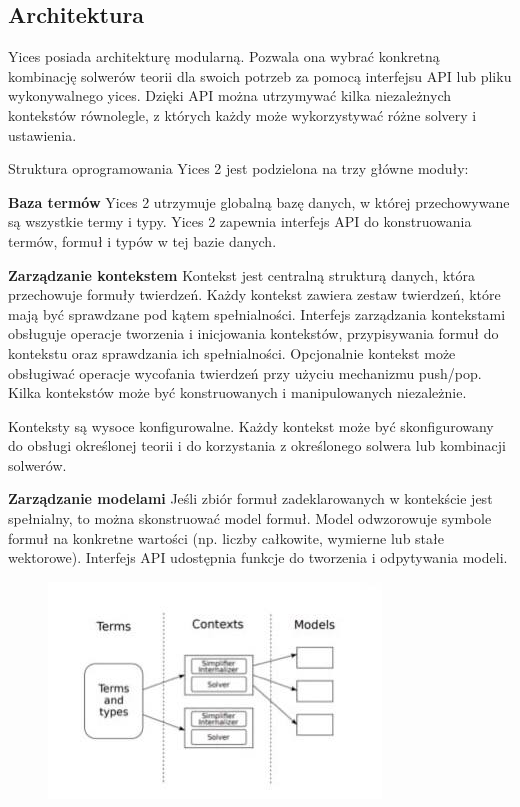 \subsection{Architektura}
Yices posiada architekturę modularną. Pozwala ona wybrać konkretną kombinację solwerów teorii dla swoich potrzeb za pomocą interfejsu API lub pliku wykonywalnego yices. Dzięki API można utrzymywać kilka niezależnych kontekstów równolegle, z których każdy może wykorzystywać różne solvery i ustawienia.

Struktura oprogramowania Yices 2 jest podzielona na trzy główne moduły:

\textbf{Baza termów} Yices 2 utrzymuje globalną bazę danych, w której przechowywane są wszystkie termy i typy.
Yices 2 zapewnia interfejs API do konstruowania termów, formuł i typów w tej bazie danych.

\textbf{Zarządzanie kontekstem} Kontekst jest centralną strukturą danych, która przechowuje formuły twierdzeń.
Każdy kontekst zawiera zestaw twierdzeń, które mają być sprawdzane pod kątem spełnialności. Interfejs zarządzania kontekstami obsługuje operacje tworzenia i inicjowania kontekstów, przypisywania formuł do kontekstu oraz sprawdzania ich spełnialności. Opcjonalnie kontekst może obsługiwać operacje wycofania twierdzeń przy użyciu mechanizmu push/pop. Kilka kontekstów może być konstruowanych i manipulowanych niezależnie.

Konteksty są wysoce konfigurowalne. Każdy kontekst może być skonfigurowany do obsługi określonej teorii i do korzystania z określonego solwera lub kombinacji solwerów.

\textbf{Zarządzanie modelami} Jeśli zbiór formuł zadeklarowanych w kontekście jest spełnialny, to można skonstruować model formuł. Model odwzorowuje symbole formuł na konkretne wartości (np. liczby całkowite, wymierne lub stałe wektorowe). Interfejs API udostępnia funkcje do tworzenia i odpytywania modeli.

\begin{figure}
	\centering
	\includegraphics[width=0.7\linewidth]{yices_architekture}
	\caption{}
	\label{fig:yices_architekture}
\end{figure}

